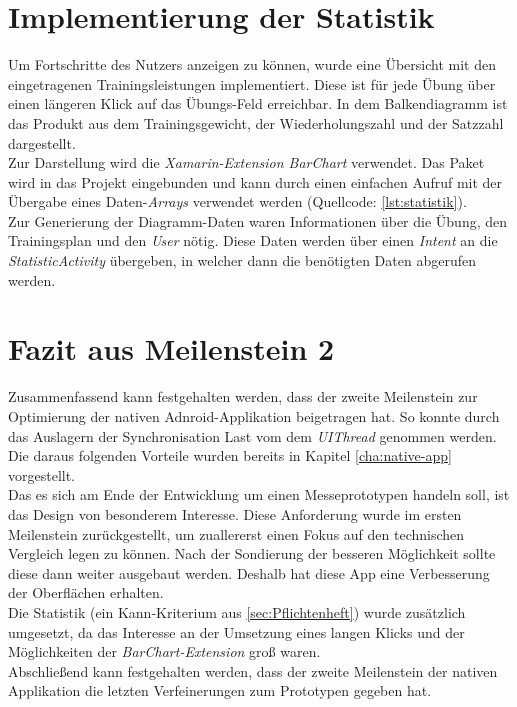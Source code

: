 \section{Implementierung der Statistik}
\label{sec:implementierung-statistik}
Um Fortschritte des Nutzers anzeigen zu können, wurde eine Übersicht mit den eingetragenen Trainingsleistungen implementiert. Diese ist für jede Übung über einen längeren Klick auf das Übungs-Feld erreichbar. In dem Balkendiagramm ist das Produkt aus dem Trainingsgewicht, der Wiederholungszahl und der Satzzahl dargestellt.\\
Zur Darstellung wird die \textit{Xamarin-Extension BarChart} verwendet. Das Paket wird in das Projekt eingebunden und kann durch einen einfachen Aufruf mit der Übergabe eines Daten-\textit{Arrays} verwendet werden (Quellcode: \ref{lst:statistik}).\\
Zur Generierung der Diagramm-Daten waren Informationen über die Übung, den Trainingsplan und den \textit{User} nötig. Diese Daten werden über einen \textit{Intent} an die \textit{StatisticActivity} übergeben, in welcher dann die benötigten Daten abgerufen werden.


\section{Fazit aus Meilenstein 2}
\label{sec:fazit-meilenstein-2}
Zusammenfassend kann festgehalten werden, dass der zweite Meilenstein zur Optimierung der nativen Adnroid-Applikation beigetragen hat. So konnte durch das Auslagern der Synchronisation Last vom dem \textit{UIThread} genommen werden. Die daraus folgenden Vorteile wurden bereits in Kapitel \ref{cha:native-app} vorgestellt.\\
Das es sich am Ende der Entwicklung um einen Messeprototypen handeln soll, ist das Design von besonderem Interesse. Diese Anforderung wurde im ersten Meilenstein zurückgestellt, um zuallererst einen Fokus auf den technischen Vergleich legen zu können. Nach der Sondierung der besseren Möglichkeit sollte diese dann weiter ausgebaut werden. Deshalb hat diese App eine Verbesserung der Oberflächen erhalten.\\
Die Statistik (ein Kann-Kriterium aus \ref{sec:Pflichtenheft}) wurde zusätzlich umgesetzt, da das Interesse an der Umsetzung eines langen Klicks und der Möglichkeiten der \textit{BarChart-Extension} groß waren.\\
Abschließend kann festgehalten werden, dass der zweite Meilenstein der nativen Applikation die letzten Verfeinerungen zum Prototypen gegeben hat.